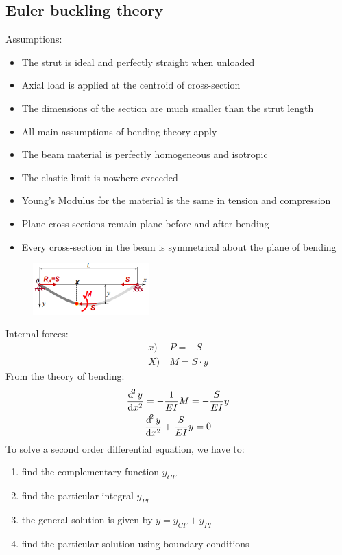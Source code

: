 \documentclass[class=report, crop=false, 12pt,a4paper]{standalone}
\begin{document}
\subsection{Euler buckling theory}
Assumptions:
\begin{itemize}
    \item The strut is ideal and perfectly straight when unloaded
    \item Axial load is applied at the centroid of cross-section
    \item The dimensions of the section are much smaller than the strut length
    \item All main assumptions of bending theory apply
    \item The beam material is perfectly homogeneous and isotropic
    \item The elastic limit is nowhere exceeded
    \item Young's Modulus for the material is the same in tension and compression
    \item Plane cross-sections remain plane before and after bending
    \item Every cross-section in the beam is symmetrical about the plane of bending
\end{itemize}
\begin{figure}[H]
    \centering
    \includegraphics[width = 0.4\textwidth]{../img/diagram24.png}
    \caption{}
\end{figure}
Internal forces:
\begin{align}
    x) & \ P = - S\\
    X) & \ M = S \cdot y
\end{align}
From the theory of bending:
\begin{gather}
    \frac{\dif^2 y}{\dif x^2} = - \frac{1}{EI}M = -\frac{S}{EI}y\\
    \frac{\dif^2 y}{\dif x^2} + \frac{S}{EI}y = 0
\end{gather}
To solve a second order differential equation, we have to:
\begin{enumerate}
    \item find the complementary function $y_{CF}$
    \item find the particular integral $y_{PI}$
    \item the general solution is given by $y = y_{CF} + y_{PI}$
    \item find the particular solution using boundary conditions
\end{enumerate}
\end{document}
